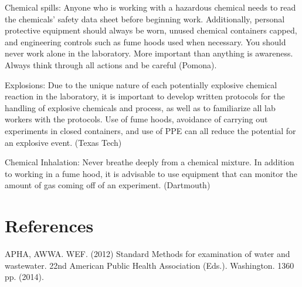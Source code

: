\documentclass[12pt]{../SOP2}
\begin{document}
Chemical spills: Anyone who is working with a hazardous chemical needs to read the chemicals’ safety data sheet before beginning work.  Additionally, personal protective equipment should always be worn, unused chemical containers capped, and engineering controls such as fume hoods used when necessary.  You should never work alone in the laboratory.  More important than anything is awareness.  Always think through all actions and be careful (Pomona).

Explosions: Due to the unique nature of each potentially explosive chemical reaction in the laboratory, it is important to develop written protocols for the handling of explosive chemicals and process, as well as to familiarize all lab workers with the protocols.  Use of fume hoods, avoidance of carrying out experiments in closed containers, and use of PPE can all reduce the potential for an explosive event.  (Texas Tech)

Chemical Inhalation: Never breathe deeply from a chemical mixture.  In addition to working in a fume hood, it is advisable to use equipment that can monitor the amount of gas coming off of an experiment. (Dartmouth)



\section{References}

\NP APHA, AWWA. WEF. (2012) Standard Methods for examination of water and wastewater. 22nd American Public Health Association (Eds.). Washington. 1360 pp. (2014).
\end{document}
